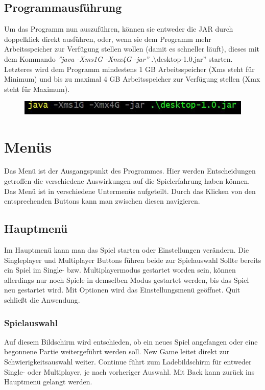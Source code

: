 \documentclass[fontsize=12pt,paper=a4,twoside]{scrartcl}
\begin{document}

\subsection{Programmausführung}

Um das Programm nun auszuführen, können sie entweder die JAR durch doppelklick direkt ausführen, oder, wenn sie dem Programm mehr Arbeitsspeicher zur Verfügung stellen wollen (damit es schneller läuft), dieses mit dem Kommando \textit{''java -Xms1G -Xmx4G -jar''} .\textbackslash desktop-1.0,jar'' starten. Letzteres wird dem Programm mindestens 1 GB Arbeitsspeicher  (Xms steht für Minimum) und bis zu maximal 4 GB Arbeitsspeicher zur Verfügung stellen (Xmx steht für Maximum).

\begin{figure}[h!]
\centering
\includegraphics[width=0.8\linewidth]{run_application.JPG}
\end{figure} 

\newpage
\section{Menüs}
Das Menü ist der Ausgangspunkt des Programmes. Hier werden Entscheidungen getroffen die verschiedene Auswirkungen auf die Spielerfahrung haben können.
Das Menü ist in verschiedene Untermenüs aufgeteilt. Durch das Klicken von den entsprechenden Buttons kann man zwischen diesen navigieren.

\subsection{Hauptmenü}
Im Hauptmenü kann man das Spiel starten oder Einstellungen verändern. Die Singleplayer und Multiplayer Buttons führen beide zur Spielauswahl
Sollte bereits ein Spiel im Single- bzw. Multiplayermodus gestartet worden sein, können allerdings nur noch Spiele in demselben Modus gestartet werden, bis das Spiel neu gestartet wird.
Mit Optionen wird das Einstellungsmenü geöffnet.
Quit schließt die Anwendung.

\subsubsection{Spielauswahl}
Auf diesem Bildschirm wird entschieden, ob ein neues Spiel angefangen oder eine begonnene Partie weitergeführt werden soll. New Game leitet direkt zur Schwierigkeitsauswahl weiter. Continue führt zum Ladebildschirm für entweder Single- oder Multiplayer, je nach vorheriger Auswahl.
Mit Back kann zurück ins Hauptmenü gelangt werden.
\end{document}
